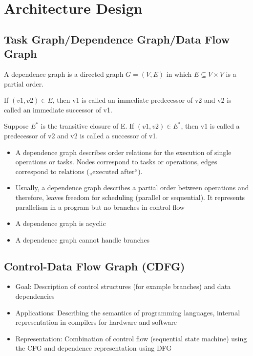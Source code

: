 

\section{Architecture Design}

\subsection{Task Graph/Dependence Graph/Data Flow Graph}
\begin{theorem}

A dependence graph is a directed graph $G=(V,E)$ in which $E \subseteq V \times V$ is a partial order.

If $(v1, v2) \in E$, then v1 is called an immediate predecessor of v2 and v2 is called an immediate successor of v1.

Suppose $E^*$ is the transitive closure of E. If $(v1, v2) \in E^*$, then v1 is called a predecessor of v2 and v2 is called a successor of v1.

\end{theorem}

\begin{itemize}[noitemsep]
\item A dependence graph describes order relations for the execution of single operations or tasks. Nodes correspond to tasks or operations, edges correspond to relations („executed after“). 
\item Usually, a dependence graph describes a partial order between operations and therefore, leaves freedom for scheduling (parallel or sequential). It represents parallelism in  a program but no branches in control flow
\item A dependence graph is acyclic
\item A dependence graph cannot handle branches
\end{itemize}


\subsection{Control-Data Flow Graph (CDFG)}

\begin{itemize}[noitemsep]
\item Goal: Description of control structures (for example branches) and 
data dependencies
\item Applications: Describing the semantics of programming languages, internal representation in compilers for hardware and software
\item Representation: Combination of control flow (sequential state machine) using the CFG and dependence representation using DFG
\end{itemize}

